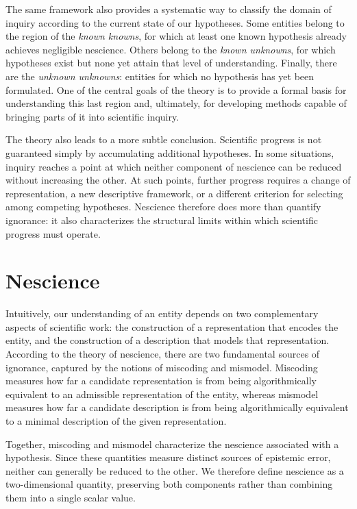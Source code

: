 The same framework also provides a systematic way to classify the domain of inquiry according to the current state of our hypotheses. Some entities belong to the region of the \emph{known knowns}, for which at least one known hypothesis already achieves negligible nescience. Others belong to the \emph{known unknowns}, for which hypotheses exist but none yet attain that level of understanding. Finally, there are the \emph{unknown unknowns}: entities for which no hypothesis has yet been formulated. One of the central goals of the theory is to provide a formal basis for understanding this last region and, ultimately, for developing methods capable of bringing parts of it into scientific inquiry.

The theory also leads to a more subtle conclusion. Scientific progress is not guaranteed simply by accumulating additional hypotheses. In some situations, inquiry reaches a point at which neither component of nescience can be reduced without increasing the other. At such points, further progress requires a change of representation, a new descriptive framework, or a different criterion for selecting among competing hypotheses. Nescience therefore does more than quantify ignorance: it also characterizes the structural limits within which scientific progress must operate.


%
%

\section{Nescience}

Intuitively, our understanding of an entity depends on two complementary aspects of scientific work: the construction of a representation that encodes the entity, and the construction of a description that models that representation. According to the theory of nescience, there are two fundamental sources of ignorance, captured by the notions of miscoding and mismodel. Miscoding measures how far a candidate representation is from being algorithmically equivalent to an admissible representation of the entity, whereas mismodel measures how far a candidate description is from being algorithmically equivalent to a minimal description of the given representation.

Together, miscoding and mismodel characterize the nescience associated with a hypothesis. Since these quantities measure distinct sources of epistemic error, neither can generally be reduced to the other. We therefore define nescience as a two-dimensional quantity, preserving both components rather than combining them into a single scalar value.

